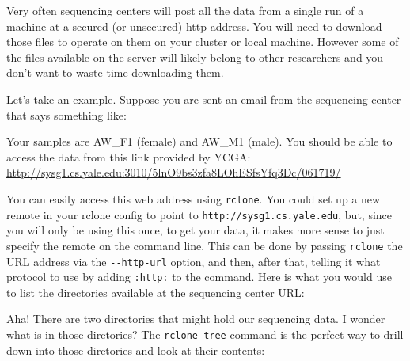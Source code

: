 \documentclass[]{krantz}
\makeatletter
\newenvironment{Shaded}{\begin{snugshade}}{\end{snugshade}}
\newcommand{\CommentTok}[1]{\textcolor[rgb]{0.37,0.37,0.37}{\textit{#1}}}
\newcommand{\ExtensionTok}[1]{#1}
\newcommand{\NormalTok}[1]{#1}
\renewenvironment{quote}{\begin{VF}}{\end{VF}}
\newenvironment{kframe}{%
\medskip{}
\setlength{\fboxsep}{.8em}
 \def\at@end@of@kframe{}%
 \ifinner\ifhmode%
  \def\at@end@of@kframe{\end{minipage}}%
  \begin{minipage}{\columnwidth}%
 \fi\fi%
 \def\FrameCommand##1{\hskip\@totalleftmargin \hskip-\fboxsep
 \colorbox{shadecolor}{##1}\hskip-\fboxsep
     \hskip-\linewidth \hskip-\@totalleftmargin \hskip\columnwidth}%
 \MakeFramed {\advance\hsize-\width
   \@totalleftmargin\z@ \linewidth\hsize
   \@setminipage}}%
 {\par\unskip\endMakeFramed%
 \at@end@of@kframe}
\renewenvironment{Shaded}{\begin{kframe}}{\end{kframe}}
\makeatother
\begin{document}
Very often sequencing centers will post all the data from a single
run of a machine at a secured (or unsecured) http address. You will
need to download those files to operate on them on your cluster or
local machine. However some of the files available on the server
will likely belong to other researchers and you don't want to waste time
downloading them.

Let's take an example. Suppose you are sent an email from the sequencing
center that says something like:

\begin{quote}
Your samples are AW\_F1 (female) and AW\_M1 (male).
You should be able to access the data from this link provided by YCGA:
\url{http://sysg1.cs.yale.edu:3010/5lnO9bs3zfa8LOhESfsYfq3Dc/061719/}
\end{quote}

You can easily access this web address using \texttt{rclone}. You could set up a new
remote in your rclone config to point to \texttt{http://sysg1.cs.yale.edu},
but, since you will only be using this once, to get your data, it makes
more sense to just specify the remote on the command line. This can be
done by passing \texttt{rclone} the URL address via the \texttt{-\/-http-url} option, and
then, after that, telling it what protocol to use by adding \texttt{:http:} to
the command. Here is what you would use to list the directories available
at the sequencing center URL:

\begin{Shaded}
\end{Shaded}

Aha! There are two directories that might hold our sequencing data.
I wonder what is in those diretories? The \texttt{rclone\ tree} command is the
perfect way to drill down into those diretories and look at their contents:
\end{document}
